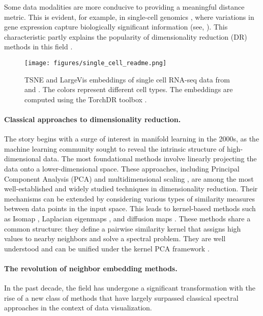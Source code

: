 Some data modalities are more conducive to providing a meaningful distance metric. This is evident, for example, in single-cell genomics \citep{amir2013visne}, where variations in gene expression capture biologically significant information (see, \eg {}). This characteristic partly explains the popularity of dimensionality reduction (DR) methods in this field \citep{kobak2019art}.


\begin{figure}[t]
    \centering
    \texttt{[image: figures/single\_cell\_readme.png]}
    \caption{TSNE and LargeVis embeddings of single cell RNA-seq data from \citep{macosko2015highly} and \citep{zheng2017massively}. The colors represent different cell types. The embeddings are computed using the TorchDR toolbox \citep{vanassel2024torchdr}.
    }
    \label{fig:intro_fig}
\end{figure}


\paragraph{Classical approaches to dimensionality reduction.}
The story begins with a surge of interest in manifold learning in the 2000s, as the machine learning community sought to reveal the intrinsic structure of high-dimensional data.
The most foundational methods involve linearly projecting the data onto a lower-dimensional space. These approaches, including Principal Component Analysis (PCA) \citep{pearson1901liii} and multidimensional scaling \citep{kruskal1978multidimensional}, are among the most well-established and widely studied techniques in dimensionality reduction. Their mechanisms can be extended by considering various types of similarity measures between data points in the input space. This leads to kernel-based methods such as Isomap \citep{balasubramanian2002isomap}, Laplacian eigenmaps \citep{belkin2003laplacian}, and diffusion maps \citep{coifman2006diffusion}. These methods share a common structure: they define a pairwise similarity kernel that assigns high values to nearby neighbors and solve a spectral problem. They are well understood and can be unified under the kernel PCA framework \citep{ham2004kernel}.

\paragraph{The revolution of neighbor embedding methods.}
In the past decade, the field has undergone a significant transformation with the rise of a new class of methods that have largely surpassed classical spectral approaches in the context of data visualization. 

